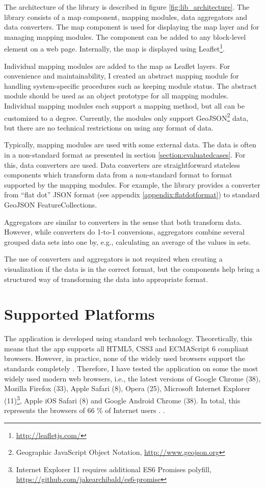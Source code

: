 The architecture of the library is described in figure \ref{fig:lib_architecture}. The library consists of a map component, mapping modules, data aggregators and data converters. The map component is used for displaying the map layer and for managing mapping modules. The component can be added to any block-level element on a web page. Internally, the map is displayed using Leaflet\footnote{\url{http://leafletjs.com/}}. 

Individual mapping modules are added to the map as Leaflet layers. For convenience and maintainability, I created an abstract mapping module for handling system-specific procedures such as keeping module status. The abstract module should be used as an object prototype for all mapping modules. Individual mapping modules each support a mapping method, but all can be customized to a degree. Currently, the modules only support GeoJSON\footnote{Geographic JavaScript Object Notation, \url{http://www.geojson.org}} data, but there are no technical restrictions on using any format of data.

Typically, mapping modules are used with some external data. The data is often in a non-standard format as presented in section \ref{section:evaluatedcases}. For this, data converters are used. Data converters are straightforward stateless components which transform data from a non-standard format to format supported by the mapping modules. For example, the library provides a converter from ``flat dot'' JSON format (see appendix \ref{appendix:flatdotformat}) to standard GeoJSON FeatureCollections.

Aggregators are similar to converters in the sense that both transform data. However, while converters do 1-to-1 conversions, aggregators combine several grouped data sets into one by, e.g., calculating an average of the values in sets.
	
The use of converters and aggregators is not required when creating a visualization if the data is in the correct format, but the components help bring a structured way of transforming the data into appropriate format.

\section{Supported Platforms}

The application is developed using standard web technology. Theoretically, this means that the app supports all HTML5, CSS3 and ECMAScript 6 compliant browsers. However, in practice, none of the widely used browsers support the standards completely \citep{manian_html5_2011}. Therefore, I have tested the application on some the most widely used modern web browsers, i.e., the latest versions of Google Chrome (38), Mozilla Firefox (33), Apple Safari (8), Opera (25), Microsoft Internet Explorer (11)\footnote{Internet Explorer 11 requires additional ES6 Promises polyfill, \url{https://github.com/jakearchibald/es6-promise}}, Apple iOS Safari (8) and Google Android Chrome (38). In total, this represents the browsers of 66 \% of Internet users \citep{statcounter_globalstats_2014}. .

